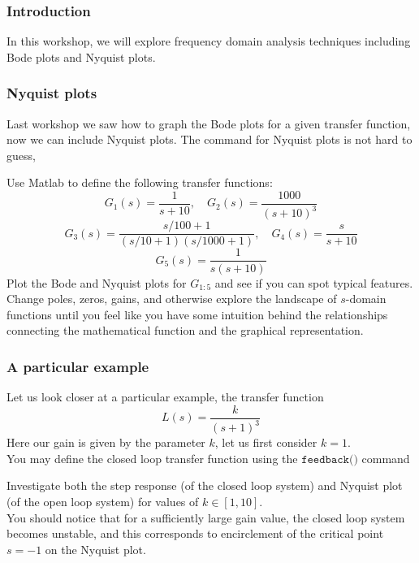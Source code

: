 \documentclass[9pt]{beamer-control}
\begin{document}

\begin{frame}
  \frametitle{Introduction}
  In this workshop, we will explore frequency domain analysis techniques including Bode plots and Nyquist plots.
\end{frame}


\begin{frame}[fragile]
  \frametitle{Nyquist plots}
  Last workshop we saw how to graph the Bode plots for a given transfer function, now we can include Nyquist plots. The command for Nyquist plots is not hard to guess,

  Use Matlab to define the following transfer functions:
  \begin{equation}
    G_1(s) = \frac{1}{s+10},  \quad  G_2(s) = \frac{1000}{(s+10)^3}
  \end{equation}
  \begin{equation}
    G_3(s) = \frac{s/100+1}{(s/10+1)(s/1000+1)} , \quad  G_4(s) = \frac{s}{s+10}
  \end{equation}
  \begin{equation}
    G_5(s) = \frac{1}{s(s+10)}
  \end{equation}
  Plot the Bode and Nyquist plots for $G_{1:5}$ and see if you can spot typical features. Change poles, zeros, gains, and otherwise explore the landscape of $s$-domain functions until you feel like you have some intuition behind the relationships connecting the mathematical function and the graphical representation.
\end{frame}


\begin{frame}[fragile]
  \frametitle{A particular example}
  Let us look closer at a particular example, the transfer function
  \begin{equation}
    L(s) =\frac{k}{(s+1)^3}
  \end{equation}
  Here our gain is given by the parameter $k$, let us first consider $k=1$.\\[10pt]
  You may define the closed loop transfer function using the $\texttt{feedback()}$ command

  Investigate both the step response (of the closed loop system) and Nyquist plot (of the open loop system) for values of $k\in[1,10]$. \\[10pt]
  You should notice that for a sufficiently large gain  value, the closed loop system becomes unstable, and this corresponds to encirclement of the critical point $s=-1$ on the Nyquist plot.
\end{frame}
\end{document}
